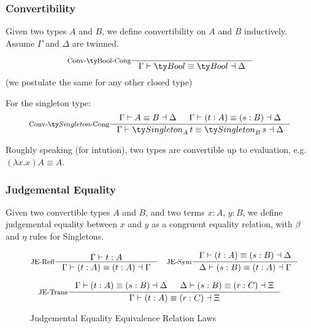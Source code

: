 \subsubsection{Convertibility}
Given two types $A$ and $B$, we define convertibility on $A$ and $B$ inductively. Assume $\Gamma$ and $\Delta$ are twinned.

\[
\inference[Conv-\Bool-Cong]{}{\Gamma \vdash \Bool \equiv \Bool \dashv \Delta}
\]
(we postulate the same for any other closed type)

For the singleton type:
\[
\inference[Conv-$\Singleton$-Cong]
    { \Gamma \vdash A \equiv B \dashv \Delta
    & \Gamma \vdash (t : A) \equiv (s : B) \dashv \Delta
    }
    { \Gamma \vdash \Singleton[A][t] \equiv \Singleton[B][s] \dashv \Delta }
\]


Roughly speaking (for intution), two types are convertible up to evaluation, e.g. $(\lambda x. x) A \equiv A$.

\subsubsection{Judgemental Equality}
Given two convertible types $A$ and $B$, and two terms $x : A$, $y : B$, we define judgemental equality between $x$ and $y$ as a congruent equality relation, with $\beta$ and $\eta$ rules for Singletons.

\begin{figure*}[h]
  \[
    \inference[JE-Refl]{\Gamma \vdash t : A}
                    {\Gamma \vdash (t : A) \equiv (t : A) \dashv \Gamma}
    \quad
    \inference[JE-Sym]{\Gamma \vdash (t : A) \equiv (s : B) \dashv \Delta}
                     {\Delta \vdash (s : B) \equiv (t : A) \dashv \Gamma}
  \]

  \[
    \inference[JE-Trans]{\Gamma \vdash (t : A) \equiv (s : B) \dashv \Delta & \Delta \vdash (s : B) \equiv (r : C) \dashv \Xi}
                     {\Gamma \vdash (t : A) \equiv (r : C) \dashv \Xi}
  \]

  \caption*{Judgemental Equality Equivalence Relation Laws}
  \label{fig:dt-singletons-je-er}
\end{figure*}


